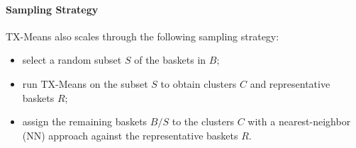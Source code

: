 \paragraph{Sampling Strategy}
TX-Means also scales through the following sampling strategy:
\begin{itemize}
    \item select a random subset $S$ of the baskets in $B$;
    \item run TX-Means on the subset $S$ to obtain clusters $C$ and representative baskets $R$;
    \item assign the remaining baskets $B/S$ to the clusters $C$ with a nearest-neighbor (NN) approach against the representative baskets $R$.
\end{itemize}
